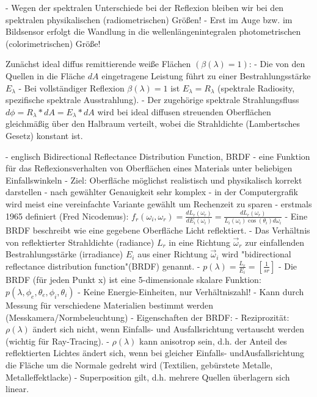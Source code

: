 \documentclass[10pt,landscape]{article}
\makeatletter
\renewcommand{\subsection}{\@startsection{subsection}{2}{0mm}%
                                {-1explus -.5ex minus -.2ex}%
                                {0.5ex plus .2ex}%
                                {\normalfont\normalsize\bfseries}}
\makeatother
\begin{document}
\begin{multicols}{3}
- Wegen der spektralen Unterschiede bei der Reflexion bleiben wir bei den spektralen physikalischen (radiometrischen) Größen!
- Erst im Auge bzw. im Bildsensor erfolgt die Wandlung in die wellenlängenintegralen photometrischen (colorimetrischen) Größe!

Zunächst ideal diffus remittierende weiße Flächen $(\beta(\lambda) = 1)$:
- Die von den Quellen in die Fläche $dA$ eingetragene Leistung führt zu einer Bestrahlungsstärke $E_{\lambda}$
- Bei vollständiger Reflexion $\beta(\lambda) = 1$ ist $E_{\lambda} = R_{\lambda}$ (spektrale Radiosity, spezifische spektrale Ausstrahlung).
- Der zugehörige spektrale Strahlungsfluss $d\phi = R_{\lambda} * dA = E_{\lambda} * dA$ wird bei ideal diffusen streuenden Oberflächen gleichmäßig über den Halbraum verteilt, wobei die Strahldichte (Lambertsches Gesetz) konstant ist.


- englisch Bidirectional Reflectance Distribution Function, BRDF
- eine Funktion für das Reflexionsverhalten von Oberflächen eines Materials unter beliebigen Einfallswinkeln
- Ziel: Oberfläche möglichst realistisch und physikalisch korrekt darstellen
- nach gewählter Genauigkeit sehr komplex
- in der Computergrafik wird meist eine vereinfachte Variante gewählt um Rechenzeit zu sparen
- erstmals 1965 definiert (Fred Nicodemus): $f_r(\omega_i, \omega_r)=\frac{dL_r(\omega_r)}{dE_i(\omega_i)}=\frac{dL_r(\omega_r)}{L_i(\omega_i)\cos(\theta_i)d\omega_i}$
- Eine BRDF beschreibt wie eine gegebene Oberfläche Licht reflektiert.
- Das Verhältnis von reflektierter Strahldichte (radiance) $L_r$ in eine Richtung $\vec{ω}_r$ zur einfallenden Bestrahlungsstärke (irradiance) $E_i$ aus einer Richtung $\vec{ω}_i$ wird "bidirectional reflectance distribution function"(BRDF) genannt.
  - $p(\lambda)=\frac{L_r}{E_i}=[\frac{1}{sr}]$
- Die BRDF (für jeden Punkt x) ist eine 5-dimensionale skalare Funktion: $p(\lambda, \phi_e, \theta_e, \phi_i, \theta_i)$
- Keine Energie-Einheiten, nur Verhältniszahl!
- Kann durch Messung für verschiedene Materialien bestimmt werden (Messkamera/Normbeleuchtung)
- Eigenschaften der BRDF:
  - Reziprozität: $ρ(\lambda)$ ändert sich nicht, wenn Einfalls- und Ausfallsrichtung vertauscht werden (wichtig für Ray-Tracing).
  - $ρ(\lambda)$ kann anisotrop sein, d.h. der Anteil des reflektierten Lichtes ändert sich, wenn bei gleicher Einfalls- undAusfallsrichtung die Fläche um die Normale gedreht wird (Textilien, gebürstete Metalle, Metalleffektlacke)
  - Superposition gilt, d.h. mehrere Quellen überlagern sich linear.


\end{multicols}
\end{document}

